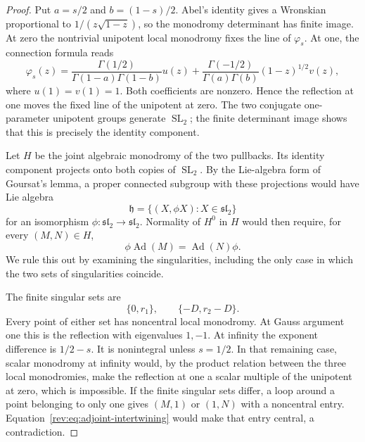 \begin{proof}
Put $a=s/2$ and $b=(1-s)/2$.  Abel's identity gives a Wronskian
proportional to $1/(z\sqrt{1-z})$, so the monodromy determinant has
finite image.  At zero the nontrivial unipotent local monodromy fixes
the line of $\varphi_s$.  At one, the connection formula reads
\[
 \varphi_s(z)=
 \frac{\Gamma(1/2)}{\Gamma(1-a)\Gamma(1-b)}u(z)
 +\frac{\Gamma(-1/2)}{\Gamma(a)\Gamma(b)}
             (1-z)^{1/2}v(z),
\]
where $u(1)=v(1)=1$.  Both coefficients are nonzero.  Hence the
reflection at one moves the fixed line of the unipotent at zero.
The two conjugate one-parameter unipotent groups generate
$\operatorname{SL}_2$; the finite determinant image shows that this
is precisely the identity component.

Let $H$ be the joint algebraic monodromy of the two pullbacks.  Its
identity component projects onto both copies of $\operatorname{SL}_2$.
By the Lie-algebra form of Goursat's lemma, a proper connected subgroup
with these projections would have Lie algebra
\begin{equation}\label{rev:eq:goursat-graph}
 \mathfrak h=\{(X,\phi X):X\in\mathfrak{sl}_2\}
\end{equation}
for an isomorphism $\phi:\mathfrak{sl}_2\to\mathfrak{sl}_2$.
Normality of $H^0$ in $H$ would then require, for every $(M,N)\in H$,
\begin{equation}\label{rev:eq:adjoint-intertwining}
       \phi\operatorname{Ad}(M)=\operatorname{Ad}(N)\phi.
\end{equation}
We rule this out by examining the singularities, including the only
case in which the two sets of singularities coincide.

The finite singular sets are
\[
                  \{0,r_1\},\qquad\{-D,r_2-D\}.
\]
Every point of either set has noncentral local monodromy.  At Gauss
argument one this is the reflection with eigenvalues $1,-1$.  At
infinity the exponent difference is $1/2-s$.  It is nonintegral
unless $s=1/2$.  In that remaining case, scalar monodromy at infinity
would, by the product relation between the three local monodromies,
make the reflection at one a scalar multiple of the unipotent at
zero, which is impossible.  If the finite singular sets differ, a
loop around a point belonging to only one gives $(M,1)$ or $(1,N)$
with a noncentral entry.  Equation~\eqref{rev:eq:adjoint-intertwining}
would make that entry central, a contradiction.


\end{proof}

